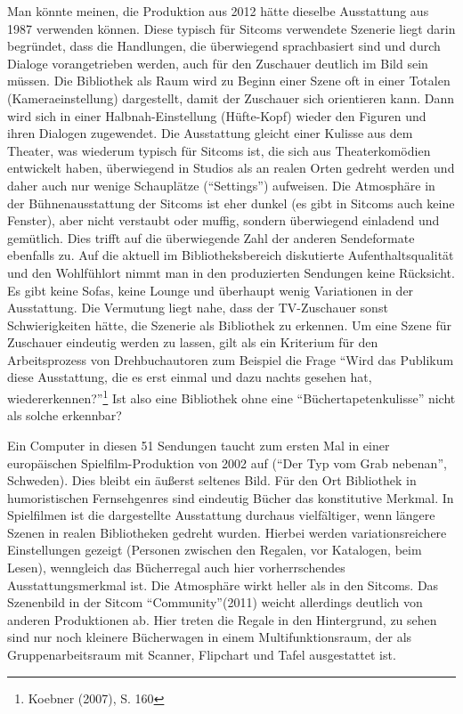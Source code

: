 
Man könnte meinen, die Produktion aus 2012 hätte dieselbe Ausstattung
aus 1987 verwenden können. Diese typisch für Sitcoms verwendete Szenerie
liegt darin begründet, dass die Handlungen, die überwiegend
sprachbasiert sind und durch Dialoge vorangetrieben werden, auch für den
Zuschauer deutlich im Bild sein müssen. Die Bibliothek als Raum wird zu
Beginn einer Szene oft in einer Totalen (Kameraeinstellung) dargestellt,
damit der Zuschauer sich orientieren kann. Dann wird sich in einer
Halbnah-Einstellung (Hüfte-Kopf) wieder den Figuren und ihren Dialogen
zugewendet. Die Ausstattung gleicht einer Kulisse aus dem Theater, was
wiederum typisch für Sitcoms ist, die sich aus Theaterkomödien
entwickelt haben, überwiegend in Studios als an realen Orten gedreht
werden und daher auch nur wenige Schauplätze (\enquote{Settings})
aufweisen. Die Atmosphäre in der Bühnenausstattung der Sitcoms ist eher
dunkel (es gibt in Sitcoms auch keine Fenster), aber nicht verstaubt
oder muffig, sondern überwiegend einladend und gemütlich. Dies trifft
auf die überwiegende Zahl der anderen Sendeformate ebenfalls zu. Auf die
aktuell im Bibliotheksbereich diskutierte Aufenthaltsqualität und den
Wohlfühlort nimmt man in den produzierten Sendungen keine Rücksicht. Es
gibt keine Sofas, keine Lounge und überhaupt wenig Variationen in der
Ausstattung. Die Vermutung liegt nahe, dass der TV-Zuschauer sonst
Schwierigkeiten hätte, die Szenerie als Bibliothek zu erkennen. Um eine
Szene für Zuschauer eindeutig werden zu lassen, gilt als ein Kriterium
für den Arbeitsprozess von Drehbuchautoren zum Beispiel die Frage
\enquote{Wird das Publikum diese Ausstattung, die es erst einmal und
dazu nachts gesehen hat, wiedererkennen?}\footnote{Koebner (2007), S.
  160} Ist also eine Bibliothek ohne eine \enquote{Büchertapetenkulisse}
nicht als solche erkennbar?

Ein Computer in diesen 51 Sendungen taucht zum ersten Mal in einer
europäischen Spielfilm-Produktion von 2002 auf (\enquote{Der Typ vom
Grab nebenan}, Schweden). Dies bleibt ein äußerst seltenes Bild. Für den
Ort Bibliothek in humoristischen Fernsehgenres sind eindeutig Bücher das
konstitutive Merkmal. In Spielfilmen ist die dargestellte Ausstattung
durchaus vielfältiger, wenn längere Szenen in realen Bibliotheken
gedreht wurden. Hierbei werden variationsreichere Einstellungen gezeigt
(Personen zwischen den Regalen, vor Katalogen, beim Lesen), wenngleich
das Bücherregal auch hier vorherrschendes Ausstattungsmerkmal ist. Die
Atmosphäre wirkt heller als in den Sitcoms. Das Szenenbild in der Sitcom
\enquote{Community}(2011) weicht allerdings deutlich von anderen
Produktionen ab. Hier treten die Regale in den Hintergrund, zu sehen
sind nur noch kleinere Bücherwagen in einem Multifunktionsraum, der als
Gruppenarbeitsraum mit Scanner, Flipchart und Tafel ausgestattet ist.

